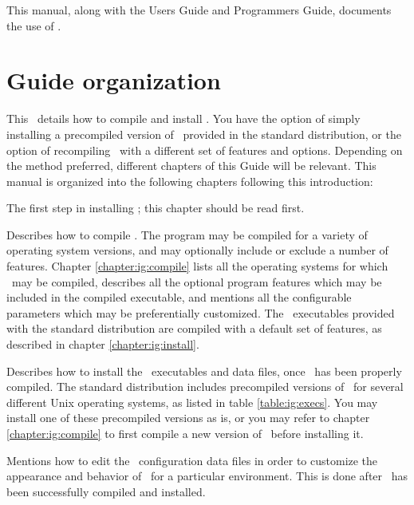 This manual, along with the Users
Guide and Programmers Guide, documents the use of \VMD.

\section{Guide organization}

This \DOCTITLE\ details how to compile and install \VMD.  You have the
option of simply installing a precompiled version of
\VMD\ provided in the standard distribution, or the option of recompiling \VMD\
with a different set of features and options.  Depending on the method
preferred, different chapters of this Guide will be relevant.  This
manual is organized into the following chapters following this
introduction:

\begin{itemize}
   The first step in installing \VMD;
this chapter should be read first.

Describes how to compile \VMD.  The program may be compiled for a
variety of operating system versions, and may optionally include
or exclude a number of features.  Chapter \ref{chapter:ig:compile}
lists all the operating systems for which \VMD\ may be compiled,
describes all the optional program features which may be included
in the compiled executable, and mentions all the configurable
parameters which may be preferentially customized.  The
\VMD\ executables provided with the standard distribution are compiled
with a default set of features, as described in chapter
\ref{chapter:ig:install}.

Describes how to install the \VMD\ executables and data files, once
\VMD\ has been properly compiled.  The standard distribution includes
precompiled versions of \VMD\ for several different Unix operating
systems, as listed in table \ref{table:ig:execs}.  You may install
one of these precompiled versions as is, or you may refer to
chapter \ref{chapter:ig:compile} to first compile a new version of \VMD\
before installing it.

Mentions how to edit the \VMD\ configuration data files in order to
customize the appearance and behavior of \VMD\ for a particular
environment.  This is done after \VMD\ has been successfully compiled
and installed.
\end{itemize}


